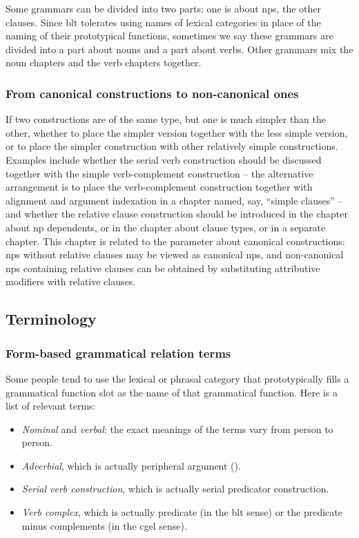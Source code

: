 \documentclass[UTF8, a4paper, oneside, scheme=plain]{ctexart}
\newcommand*{\term}[1]{\emph{#1}}
\begin{document}
Some grammars can be divided into two parts:
one is about \ac{np}s,
the other clauses.
Since \ac{blt} tolerates using names of lexical categories in place of the naming of their prototypical functions,
sometimes we say these grammars are divided into 
a part about nouns and a part about verbs.
Other grammars mix the noun chapters and the verb chapters together.

\subsubsection{From canonical constructions to non-canonical ones}

If two constructions are of the same type,
but one is much simpler than the other,
whether to place the simpler version together with the less simple version,
or to place the simpler construction with other relatively simple constructions.
Examples include whether the serial verb construction should be discussed 
together with the simple verb-complement construction 
-- the alternative arrangement is to place the verb-complement construction 
together with alignment and argument indexation in a chapter named, say, ``simple clauses'' -- 
and whether the relative clause construction 
should be introduced in the chapter about \ac{np} dependents,
or in the chapter about clause types,
or in a separate chapter.
This chapter is related to the parameter about canonical constructions:
\ac{np}s without relative clauses may be viewed as canonical \ac{np}s,
and non-canonical \ac{np}s containing relative clauses 
can be obtained by substituting attributive modifiers with relative clauses.


\subsection{Terminology}

\subsubsection{Form-based grammatical relation terms}\label{sec:form-based-function-name}

Some people tend to use the lexical or phrasal category 
that prototypically fills a grammatical function slot 
as the name of that grammatical function.
Here is a list of relevant terms:
\begin{itemize}
    \item \term{Nominal} and \term{verbal}: the exact meanings of the terms vary from person to person.
    \item \term{Adverbial}, which is actually peripheral argument ().
    \item \term{Serial verb construction}, which is actually serial predicator construction.
    \item \term{Verb complex}, which is actually predicate (in the \ac{blt} sense) 
    or the predicate minus complements (in the \ac{cgel} sense).
\end{itemize}
\end{document}
